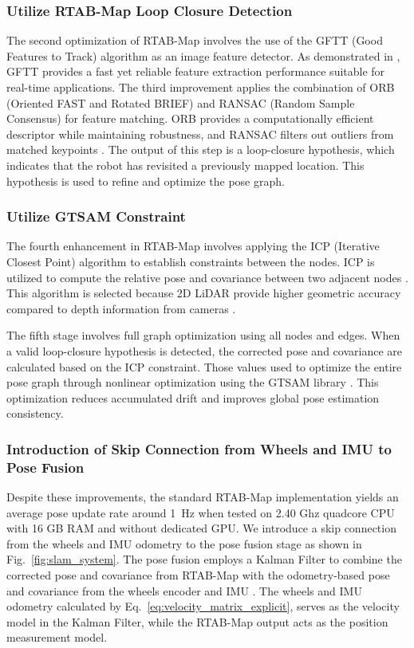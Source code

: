 \documentclass[conference, a4paper]{IEEEtran}[2015/08/26]
\begin{document}
\subsubsection{Utilize RTAB-Map Loop Closure Detection}
The second optimization of RTAB-Map involves the use of the GFTT (Good Features to Track) algorithm as an image feature detector. As demonstrated in \cite{ref_image_matching}, GFTT provides a fast yet reliable feature extraction performance suitable for real-time applications. The third improvement applies the combination of ORB (Oriented FAST and Rotated BRIEF) and RANSAC (Random Sample Consensus) for feature matching. ORB provides a computationally efficient descriptor while maintaining robustness, and RANSAC filters out outliers from matched keypoints \cite{ref_orb_ransac}. The output of this step is a loop-closure hypothesis, which indicates that the robot has revisited a previously mapped location. This hypothesis is used to refine and optimize the pose graph.

\subsubsection{Utilize GTSAM Constraint}
The fourth enhancement in RTAB-Map involves applying the ICP (Iterative Closest Point) algorithm to establish constraints between the nodes. ICP is utilized to compute the relative pose and covariance between two adjacent nodes \cite{ref_icp}. This algorithm is selected because 2D LiDAR provide higher geometric accuracy compared to depth information from cameras \cite{ref_lidarvscamera}.

\par
The fifth stage involves full graph optimization using all nodes and edges. When a valid loop-closure hypothesis is detected, the corrected pose and covariance are calculated based on the ICP constraint. Those values used to optimize the entire pose graph through nonlinear optimization using the GTSAM library \cite{ref_gtsam}. This optimization reduces accumulated drift and improves global pose estimation consistency.

\subsubsection{Introduction of Skip Connection from Wheels and IMU to Pose Fusion}
Despite these improvements, the standard RTAB-Map implementation yields an average pose update rate around 1~Hz when tested on 2.40 Ghz quadcore CPU with 16 GB RAM and without dedicated GPU. We introduce a skip connection from the wheels and IMU odometry to the pose fusion stage as shown in Fig.~\ref{fig:slam_system}. The pose fusion employs a Kalman Filter to combine the corrected pose and covariance from RTAB-Map with the odometry-based pose and covariance from the wheels encoder and IMU \cite{ref_mas_marin}. The wheels and IMU odometry calculated by Eq.~\ref{eq:velocity_matrix_explicit}, serves as the velocity model in the Kalman Filter, while the RTAB-Map output acts as the position measurement model.
\end{document}
